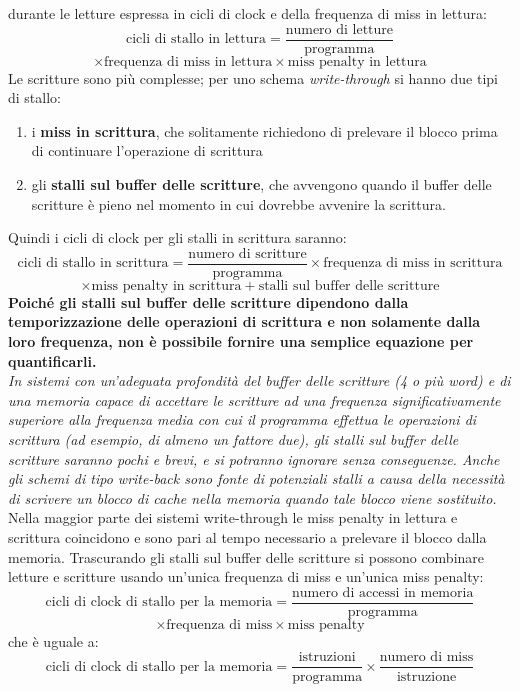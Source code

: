 \documentclass[a4paper,12pt, oneside]{book}
\begin{document}
durante le letture espressa in cicli di clock e della frequenza di
miss in lettura:
\[\mbox{cicli di stallo in lettura} = \frac{\mbox{numero di
      letture}}{\mbox{programma}}\]
\[\times \mbox{frequenza di miss in lettura} \times \mbox{miss penalty in lettura}\]
Le scritture sono più complesse; per uno schema \textit{write-through}
si hanno due tipi di stallo:
\begin{enumerate}
  \item i \textbf{miss in scrittura}, che solitamente richiedono di prelevare
  il blocco prima di continuare l'operazione di scrittura
  \item gli\textbf{ stalli sul buffer delle scritture},
  che avvengono quando il buffer delle scritture è pieno
  nel momento in cui dovrebbe avvenire la scrittura.
\end{enumerate}
Quindi i cicli di clock per gli stalli in scrittura saranno:
\[\mbox{cicli di stallo in scrittura} = \frac{\mbox{numero di
    scritture}}{\mbox{programma}} \times \mbox{frequenza di miss in scrittura}\]
\[\times \mbox{miss penalty in scrittura} + \mbox{stalli sul
    buffer delle scritture}\]
\textbf{Poiché gli stalli sul buffer delle scritture dipendono dalla
  temporizzazione delle operazioni di scrittura e non solamente dalla
  loro frequenza, non è possibile fornire una semplice
  equazione per quantificarli.}\\
\textit{In sistemi con un'adeguata profondità del buffer delle
  scritture (4 o più word) e di
una memoria capace di accettare le scritture ad una frequenza significativamente
superiore alla frequenza media con cui il programma effettua
le operazioni di scrittura (ad esempio, di almeno un fattore due), gli
stalli sul buffer delle scritture saranno pochi e brevi,
e si potranno ignorare senza conseguenze. Anche gli schemi di tipo
write-back sono fonte di potenziali stalli a causa della
necessità di scrivere un blocco di cache nella memoria quando tale blocco viene
sostituito.}\\
Nella maggior parte dei sistemi write-through le miss penalty in
lettura e scrittura coincidono e sono pari al tempo necessario a
prelevare il blocco dalla memoria. Trascurando gli stalli sul buffer
delle scritture si possono combinare letture e scritture usando
un'unica frequenza di miss e un'unica miss penalty:
\[\mbox{cicli di clock di stallo per la memoria} = \frac{\mbox{numero
      di accessi in memoria}}{\mbox{programma}}\]
\[\times \mbox{frequenza di miss} \times \mbox{miss penalty}\]
che è uguale a:
\[\mbox{cicli di clock di stallo per la memoria} =
  \frac{\mbox{istruzioni}}{\mbox{programma}}\times \frac{\mbox{numero
      di miss}}{\mbox{istruzione}}\]
\end{document}
